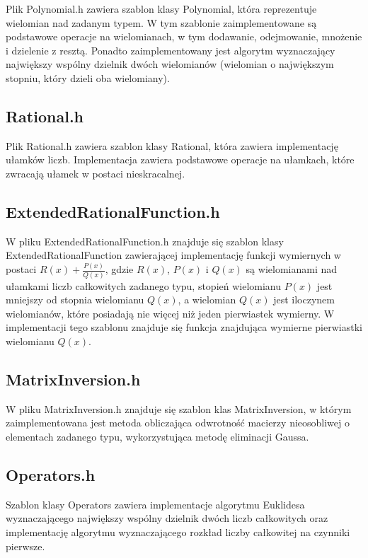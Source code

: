 Plik Polynomial.h zawiera szablon klasy Polynomial, która reprezentuje wielomian nad zadanym typem. W tym szablonie zaimplementowane są podstawowe operacje na wielomianach, w tym dodawanie, odejmowanie, mnożenie i dzielenie z resztą. Ponadto zaimplementowany jest algorytm wyznaczający największy wspólny dzielnik dwóch wielomianów (wielomian o największym stopniu, który dzieli oba wielomiany).

\subsection{Rational.h}

Plik Rational.h zawiera szablon klasy Rational, która zawiera implementację ułamków liczb. Implementacja zawiera podstawowe operacje na ułamkach, które zwracają ułamek w postaci nieskracalnej.

\subsection{ExtendedRationalFunction.h}

W pliku ExtendedRationalFunction.h znajduje się szablon klasy ExtendedRationalFunction zawierającej implementację funkcji wymiernych w postaci $R(x)+\frac{P(x)}{Q(x)}$, gdzie $R(x)$, $P(x)$ i $Q(x)$ są wielomianami nad ułamkami liczb całkowitych zadanego typu, stopień wielomianu $P(x)$ jest mniejszy od stopnia wielomianu $Q(x)$, a wielomian $Q(x)$ jest iloczynem wielomianów, które posiadają nie więcej niż jeden pierwiastek wymierny. W implementacji tego szablonu znajduje się funkcja znajdująca wymierne pierwiastki wielomianu $Q(x)$.

\subsection{MatrixInversion.h}

W pliku MatrixInversion.h znajduje się szablon klas MatrixInversion, w którym zaimplementowana jest metoda obliczająca odwrotność macierzy nieosobliwej o elementach zadanego typu, wykorzystująca metodę eliminacji Gaussa.

\subsection{Operators.h}

Szablon klasy Operators zawiera implementacje algorytmu Euklidesa wyznaczającego największy wspólny dzielnik dwóch liczb całkowitych oraz implementację algorytmu wyznaczającego rozkład liczby całkowitej na czynniki pierwsze.

